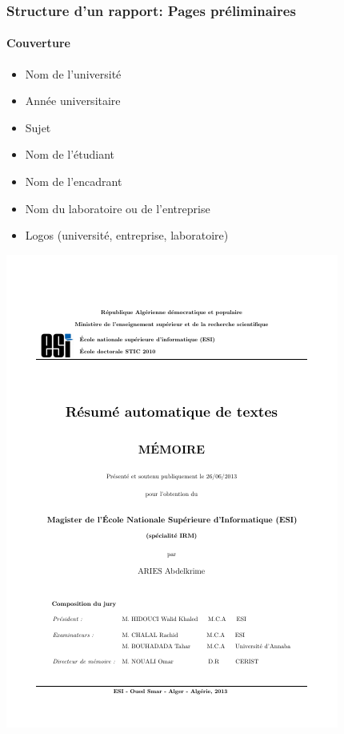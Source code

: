 \documentclass[xcolor=table]{beamer}
\begin{document}
\begin{frame}
\frametitle{Structure d'un rapport: Pages préliminaires}
\framesubtitle{Couverture}

\begin{minipage}{0.52\textwidth}
	\begin{itemize}
		\item Nom de l'université 
		\item Année universitaire
		\item Sujet
		\item Nom de l'étudiant
		\item Nom de l'encadrant 
		\item Nom du laboratoire ou de l'entreprise
		\item Logos (université, entreprise, laboratoire)
	\end{itemize}
\end{minipage}
\begin{minipage}{0.42\textwidth}
	\includegraphics[width=\textwidth]{..//img/Bweb03-redaction/couverture.png}
\end{minipage}

\end{frame}
\end{document}
